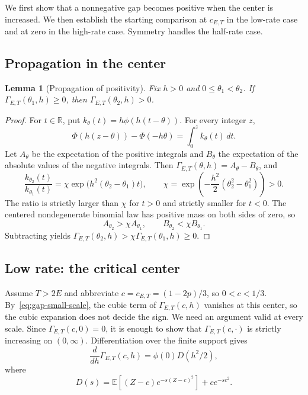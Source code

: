 \documentclass[11pt]{article}
\newtheorem{lemma}[theorem]{Lemma}
\theoremstyle{remark}
\newcommand{\R}{\mathbb R}
\newcommand{\E}{\mathbb E}
\begin{document}
We first show that a nonnegative gap becomes positive when the center is
increased. We then establish the starting comparison at $c_{E,T}$ in the
low-rate case and at zero in the high-rate case. Symmetry handles the
half-rate case.

\subsection{Propagation in the center}
\begin{lemma}[Propagation of positivity]\label{lem:binomial-propagation}
Fix $h>0$ and $0\leq\theta_1<\theta_2$. If
$\Gamma_{E,T}(\theta_1,h)\geq0$, then
$\Gamma_{E,T}(\theta_2,h)>0$.
\end{lemma}

\begin{proof}
For $t\in\R$, put $k_\theta(t)=h\phi(h(t-\theta))$. For every integer $z$,
\[
 \Phi(h(z-\theta))-\Phi(-h\theta)=\int_0^z k_\theta(t)\,dt.
\]
Let $A_\theta$ be the expectation of the positive integrals and $B_\theta$
the expectation of the absolute values of the negative integrals. Then
$\Gamma_{E,T}(\theta,h)=A_\theta-B_\theta$, and
\[
 \frac{k_{\theta_2}(t)}{k_{\theta_1}(t)}
 =\chi\exp\bigl(h^2(\theta_2-\theta_1)t\bigr),
 \qquad
 \chi=\exp\left(-\frac{h^2}{2}(\theta_2^2-\theta_1^2)\right)>0.
\]
The ratio is strictly larger than $\chi$ for $t>0$ and strictly smaller for
$t<0$. The centered nondegenerate binomial law has positive mass on both
sides of zero, so
\[
 A_{\theta_2}>\chi A_{\theta_1},\qquad
 B_{\theta_2}<\chi B_{\theta_1}.
\]
Subtracting yields
$\Gamma_{E,T}(\theta_2,h)>\chi\Gamma_{E,T}(\theta_1,h)\geq0$.
\end{proof}

\subsection{Low rate: the critical center}
Assume $T>2E$ and abbreviate $c=c_{E,T}=(1-2p)/3$, so $0<c<1/3$.
By~\eqref{eq:gap-small-scale}, the cubic term of $\Gamma_{E,T}(c,h)$
vanishes at this center, so the cubic expansion does not decide the sign.
We need an argument valid at every scale. Since $\Gamma_{E,T}(c,0)=0$, it is
enough to show that $\Gamma_{E,T}(c,\cdot)$ is strictly increasing on
$(0,\infty)$. Differentiation over the finite support gives
\begin{equation}\label{eq:binomial-scale-derivative}
 \frac{d}{dh}\Gamma_{E,T}(c,h)=\phi(0)D(h^2/2),
\end{equation}
where
\begin{equation}\label{eq:binomial-laplace}
 D(s)=\E[(Z-c)e^{-s(Z-c)^2}]+ce^{-sc^2}.
\end{equation}
\end{document}
